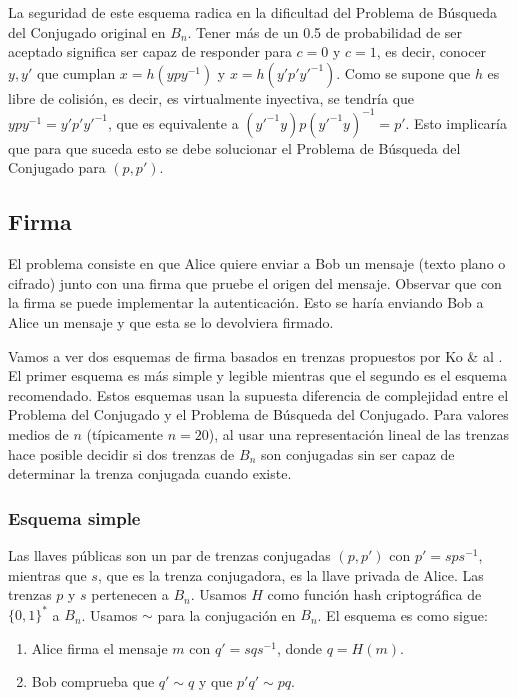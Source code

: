 \documentclass[12pt]{book}
\theoremstyle{definition}
\begin{document}
La seguridad de este esquema radica en la dificultad del Problema de Búsqueda del Conjugado original en $B_n$. Tener más de un 0.5 de probabilidad de ser aceptado significa ser capaz de responder para $c=0$ y $c=1$, es decir, conocer $y,y'$ que cumplan $x=h(ypy^{-1})$ y $x=h(y'p'y'^{-1})$. Como se supone que $h$ es libre de colisión, es decir, es virtualmente inyectiva, se tendría que $ypy^{-1}=y'p'y'^{-1}$, que es equivalente a $(y'^{-1}y)p(y'^{-1}y)^{-1}=p'$. Esto implicaría que para que suceda esto se debe solucionar el Problema de Búsqueda del Conjugado para $(p,p')$.

\subsection{Firma}
El problema consiste en que Alice quiere enviar a Bob un mensaje (texto plano o cifrado) junto con una firma que pruebe el origen del mensaje. Observar que con la firma se puede implementar la autenticación. Esto se haría enviando Bob a Alice un mensaje y que esta se lo devolviera firmado.

Vamos a ver dos esquemas de firma basados en trenzas propuestos por Ko \& al \cite{Ko_sig}. El primer esquema es más simple y legible mientras que el segundo es el esquema recomendado. Estos esquemas usan la supuesta diferencia de complejidad entre el Problema del Conjugado y el Problema de Búsqueda del Conjugado. Para valores medios de $n$ (típicamente $n=20$), al usar una representación lineal de las trenzas hace posible decidir si dos trenzas de $B_n$ son conjugadas sin ser capaz de determinar la trenza conjugada cuando existe.

\subsubsection*{Esquema simple}
Las llaves públicas son un par de trenzas conjugadas $(p,p')$ con $p'=sps^{-1}$, mientras que $s$, que es la trenza conjugadora, es la llave privada de Alice. Las trenzas $p$ y $s$ pertenecen a $B_n$. Usamos $H$ como función hash criptográfica de $\{0,1\}^*$ a $B_n$. Usamos $\sim$ para la conjugación en $B_n$. El esquema es como sigue:


\begin{enumerate}
\item Alice firma el mensaje $m$ con $q'=sqs^{-1}$, donde $q=H(m)$.
\item Bob comprueba que $q'\sim q$ y que $p'q'\sim pq$.
\end{enumerate}
\end{document}
